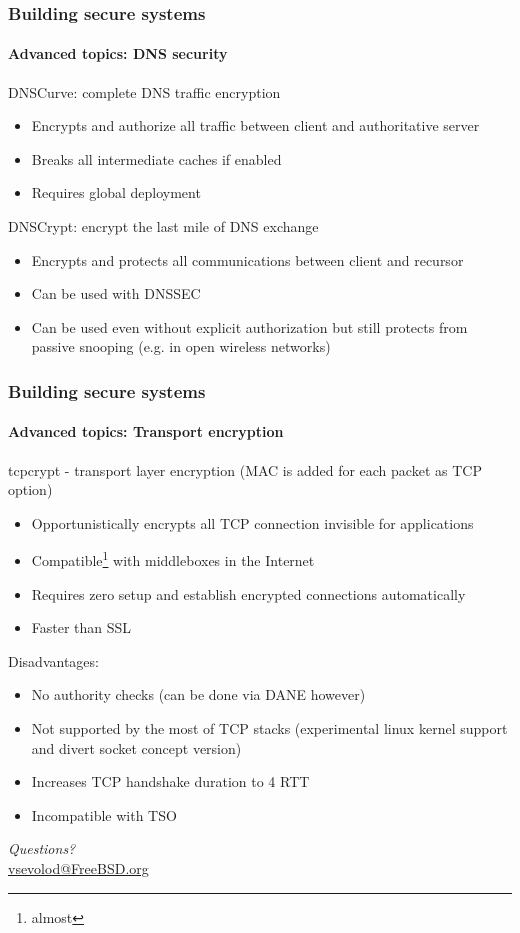 \documentclass[11pt,t]{beamer}
\begin{document}
\begin{frame}[fragile]
\frametitle{Building secure systems}
\framesubtitle{Advanced topics: DNS security}
DNSCurve: complete DNS traffic encryption
\begin{itemize}
\item Encrypts and authorize all traffic between client and authoritative server
\item Breaks all intermediate caches if enabled
\item Requires global deployment
\end{itemize}
DNSCrypt: encrypt the last mile of DNS exchange
\begin{itemize}
\item Encrypts and protects all communications between client and recursor
\item Can be used with DNSSEC
\item Can be used even without explicit authorization but still protects from passive 
snooping (e.g. in open wireless networks)
\end{itemize}
\end{frame}

\begin{frame}[fragile]
\frametitle{Building secure systems}
\framesubtitle{Advanced topics: Transport encryption}
tcpcrypt - transport layer encryption (MAC is added for each packet as TCP option)
\begin{itemize}
\item Opportunistically encrypts all TCP connection invisible for applications
\item Compatible\footnote{almost} with middleboxes in the Internet
\item Requires zero setup and establish encrypted connections automatically
\item Faster than SSL
\end{itemize}
Disadvantages:
\begin{itemize}
\item No authority checks (can be done via DANE however)
\item Not supported by the most of TCP stacks (experimental linux kernel support and 
divert socket concept version)
\item Increases TCP handshake duration to 4 RTT
\item Incompatible with TSO
\end{itemize}
\end{frame}

\begin{frame}
\vfill\vfill\centering
\emph{Questions?} \\[4pt]
\url{vsevolod@FreeBSD.org}
\vfill\vfill
\end{frame}
\end{document}
